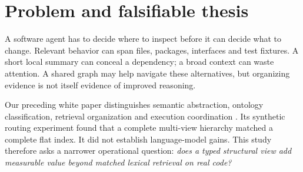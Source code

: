 \documentclass[11pt]{article}
\begin{document}
\begin{abstract}
An abstraction graph is useful to a software agent only if it improves decisions enough to justify its construction, consultation and maintenance costs. We develop a falsifiable evaluation programme for a repository ``intuition engine,'' implement a read-only local Model Context Protocol (MCP) service, and execute a frozen, matched-corpus retrieval assay on real RepoQA release data. The engine combines lexical retrieval with file/module views and conservative call-name hints, returning revision-scoped source evidence rather than unsupported correctness claims. The assay includes simple lexical scanning, flat BM25 and graph-assisted BM25; separates development and evaluation repositories; and uses the actual upstream scoring definitions. Transport is checked independently through real MCP client calls. The final section reports all measured outcomes, including the absence of a convincing graph advantage. This development study does not measure language-model repair success, cross-harness transfer, or hundred-agent scaling: fresh Codex authentication failed before inference and monetary accounting remains unqualified. The contribution is an operational prototype, a reproducible negative/near-null retrieval result, and explicit gates separating engineering readiness from scientific effectiveness.
\end{abstract}
\tableofcontents\clearpage

\section{Problem and falsifiable thesis}
A software agent has to decide where to inspect before it can decide what to change. Relevant behavior can span files, packages, interfaces and test fixtures. A short local summary can conceal a dependency; a broad context can waste attention. A shared graph may help navigate these alternatives, but organizing evidence is not itself evidence of improved reasoning.

Our preceding white paper distinguishes semantic abstraction, ontology classification, retrieval organization and execution coordination \citep{ood2026}. Its synthetic routing experiment found that a complete multi-view hierarchy matched a complete flat index. It did not establish language-model gains. This study therefore asks a narrower operational question: \emph{does a typed structural view add measurable value beyond matched lexical retrieval on real code?}
\end{document}
